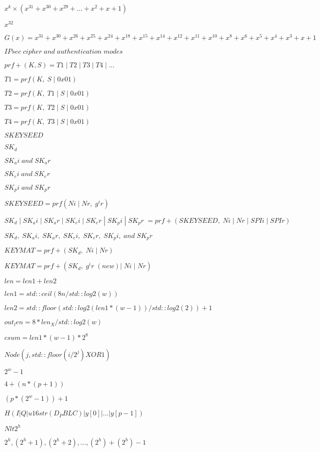 \documentclass{article}
\begin{document}
$x^k × ({x}^{31} + {x}^{30} + {x}^{29} +...+ x^2 + x + 1)$
\pagebreak

${x}^{32}$
\pagebreak

\[
 G(x) = {x}^{31} + {x}^{30} + {x}^{26} + {x}^{25} + {x}^{24} + {x}^{18} + {x}^{15} + {x}^{14} + {x}^{12} + {x}^{11} + {x}^{10} + x^8 + x^6 + x^5 + x^4 + x^3 + x + 1
\]
\pagebreak

$ IPsec\; cipher\; and\; authentication\; modes $
\pagebreak

$ prf+ (K,S) = T1\;|\;T2\;|\;T3\;|\;T4\;|\;...$
\pagebreak

$ T1 = prf (K,\;S\;|\;0x01)$
\pagebreak

$ T2 = prf (K,\;T1\;|\;S\;|\;0x01)$
\pagebreak

$ T3 = prf (K,\;T2\;|\;S\;|\;0x01)$
\pagebreak

$ T4 = prf (K,\;T3\;|\;S\;|\;0x01)$
\pagebreak

$ SKEYSEED$
\pagebreak

$ SK_d$
\pagebreak

$SK_ai \; and \; SK_ar$
\pagebreak

$ SK_ei \; and \; SK_er$
\pagebreak

$ SK_pi \; and \; SK_pr$
\pagebreak

$ SKEYSEED = prf(Ni\;|\;Nr,\;g^ir)$
\pagebreak

$ {SK_d\;|\;SK_ai\;|\;SK_ar\;|\;SK_ei\;|\;SK_er\;|\;SK_pi\;|\;SK_pr\;} = prf+ (SKEYSEED,\;Ni\;|\;Nr\;|\;SPIi\;|\;SPIr)$
\pagebreak

$ SK_d,\;SK_ai,\;SK_ar,\;SK_ei,\;SK_er,\;SK_pi,\;and\;SK_pr$
\pagebreak

$ KEYMAT = prf+(SK_d,\;Ni\;|\;Nr) $
\pagebreak

$ KEYMAT = prf+(SK_d,\;g^ir\;(new) |\;Ni\;|\;Nr) $
\pagebreak

$ len = len1 + len2 $
\pagebreak

$ len1 = std::ceil(8n/std::log2(w)) $
\pagebreak

$ len2 = std::floor(std::log2(len1 * (w-1))/std::log2(2)) + 1 $
\pagebreak

$ out_len = 8 * len_X / std::log2(w) $
\pagebreak

$ csum = len1 * (w - 1) * {2}^{8} $
\pagebreak

$ Node(j, std::floor(i/{2}^{j}) XOR 1) $
\pagebreak

$ {2}^{w} - 1 $
\pagebreak

$ 4 + (n * (p + 1)) $
\pagebreak

$ (p * ({2}^{w} - 1)) + 1 $
\pagebreak

$ H(I | Q | u16str(D_PBLC) | y[0] | ... | y[p-1]) $
\pagebreak

$ N lt {2}^{h} $
\pagebreak

$ {2}^{h}, ({2}^{h} + 1), ({2}^{h} + 2), ..., ({2}^{h})+({2}^{h})-1 $
\pagebreak
\end{document}

